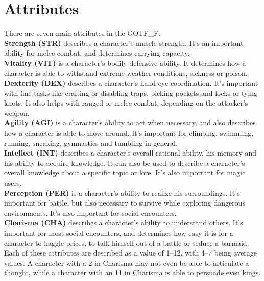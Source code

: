 \section{Attributes}\label{sec:stats}
There are seven main attributes in the GOTF\_F:\\

\textbf{Strength (STR)}\label{stat:strength} describes a character's muscle strength.
It's an important ability for melee combat, and determines carrying capacity.\\

\textbf{Vitality (VIT)}\label{stat:vitality} is a character's bodily defensive ability.
It determines how a character is able to withstand extreme weather conditions, sickness or poison.\\

\textbf{Dexterity (DEX)}\label{stat:dexterity} describes a character's hand-eye-coordination.
It's important with fine tasks like crafting or disabling traps, picking pockets and locks or tying knots.
It also helps with ranged or melee combat, depending on the attacker's weapon.\\

\textbf{Agility (AGI)}\label{stat:agility} is a character's ability to act when necessary, and also describes how a character is able to move around.
It's important for climbing, swimming, running, sneaking, gymnastics and tumbling in general.\\

\textbf{Intellect (INT)}\label{stat:intellect} describes a character's overall rational ability, his memory and his ability to acquire knowledge.
It can also be used to describe a character's overall knowledge about a specific topic or lore.
It's also important for magic users.\\

\textbf{Perception (PER)}\label{stat:perception} is a character's ability to realize his surroundings.
It's important for battle, but also necessary to survive while exploring dangerous environments.
It's also important for social encounters.\\

\textbf{Charisma (CHA)}\label{stat:charisma} describes a character's ability to understand others.
It's important for most social encounters, and determines how easy it is for a character to haggle prices, to talk himself out of a battle or seduce a barmaid.\\

Each of these attributes are described as a value of 1--12, with 4--7 being average values.
A character with a 2 in Charisma may not even be able to articulate a thought, while a character with an 11 in Charisma is able to persuade even kings.